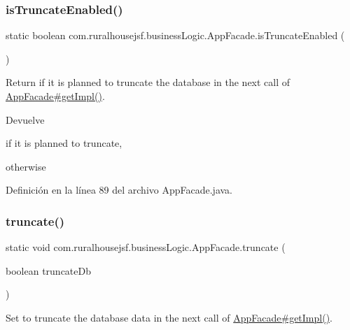 \subsubsection{\texorpdfstring{isTruncateEnabled()}{isTruncateEnabled()}}
{\footnotesize\ttfamily static boolean com.\+ruralhousejsf.\+business\+Logic.\+App\+Facade.\+is\+Truncate\+Enabled (\begin{DoxyParamCaption}{ }\end{DoxyParamCaption})\hspace{0.3cm}{\ttfamily [static]}}



Return if it is planned to truncate the database in the next call of \mbox{\hyperlink{a00128_a029bcceee98b9070b9f80abc54db45d6}{App\+Facade\#get\+Impl()}}. 

\begin{DoxyReturn}{Devuelve}

\begin{DoxyCode}{0}
\DoxyCodeLine{\textcolor{keyword}{true} }
\end{DoxyCode}
 if it is planned to truncate,
\begin{DoxyCode}{0}
\DoxyCodeLine{\textcolor{keyword}{false} }
\end{DoxyCode}
 otherwise 
\end{DoxyReturn}


Definición en la línea 89 del archivo App\+Facade.\+java.

\mbox{\label{a00128_a98aed1ed8a03c6a92e15121fed4eb452}} 
\subsubsection{\texorpdfstring{truncate()}{truncate()}}
{\footnotesize\ttfamily static void com.\+ruralhousejsf.\+business\+Logic.\+App\+Facade.\+truncate (\begin{DoxyParamCaption}\item[{boolean}]{truncate\+Db }\end{DoxyParamCaption})\hspace{0.3cm}{\ttfamily [static]}}



Set to truncate the database data in the next call of \mbox{\hyperlink{a00128_a029bcceee98b9070b9f80abc54db45d6}{App\+Facade\#get\+Impl()}}. 


